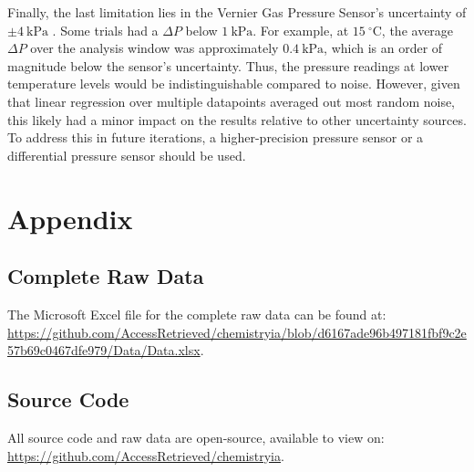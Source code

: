 \documentclass[hyphens]{article}
\begin{document}
Finally, the last limitation lies in the Vernier Gas Pressure Sensor's uncertainty of $\pm 4\ \text{kPa}$ \cite{GasPressureSensor}. Some trials had a $\Delta{P}$ below $1\ \text{kPa}$. For example, at $15\ ^\circ \text{C}$, the average $\Delta{P}$ over the analysis window was approximately $0.4\ \text{kPa}$, which is an order of magnitude below the sensor's uncertainty. Thus, the pressure readings at lower temperature levels would be indistinguishable compared to noise. However, given that linear regression over multiple datapoints averaged out most random noise, this likely had a minor impact on the results relative to other uncertainty sources. To address this in future iterations, a higher-precision pressure sensor or a differential pressure sensor should be used.


\newpage
\nocite{*}



\newpage
\appendix
\section{Appendix}
\label{sec:appendix}

\subsection{Complete Raw Data }
\label{sec:appendix-complete-raw-data}
\indent \indent The Microsoft Excel file for the complete raw data can be found at: \href{https://github.com/AccessRetrieved/chemistryia/blob/d6167ade96b497181fbf9c2e57b69c0467dfe979/Data/Data.xlsx}{\url{https://github.com/AccessRetrieved/chemistryia/blob/d6167ade96b497181fbf9c2e57b69c0467dfe979/Data/Data.xlsx}}.

\subsection{Source Code}
\label{sec:appendix-ia-cam-recorder-fan}
\indent \indent All source code and raw data are open-source, available to view on: \href{https://github.com/AccessRetrieved/chemistryia}{\url{https://github.com/AccessRetrieved/chemistryia}}.

\thispagestyle{empty}
\end{document}
